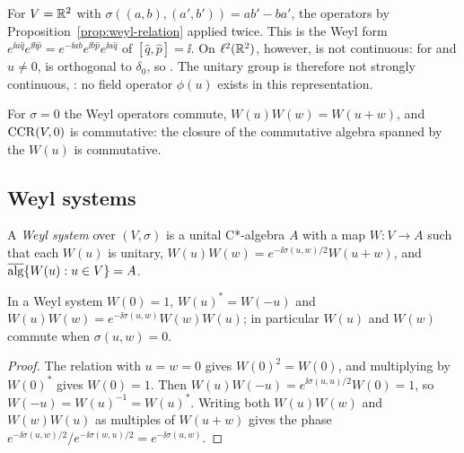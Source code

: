 \begin{example}\label{ex:one-dof}
For $V=\mathbb R^2$ with $\sigma((a,b),(a',b'))=ab'-ba'$, the operators  by Proposition~\ref{prop:weyl-relation} applied twice.
This is the Weyl form $e^{\ii a\hat q}e^{\ii b\hat p}=e^{-\ii ab}e^{\ii b\hat p}e^{\ii a\hat q}$
of $[\hat q,\hat p]=\ii$. On $\ell^2(\mathbb R^2)$, however,  is not continuous: for
 and $u\neq0$,  is orthogonal to $\delta_0$, so
. The unitary group  is therefore not
strongly continuous, : no field operator
$\phi(u)$ exists in this representation.
\end{example}

\begin{example}\label{ex:sigma-zero}
For $\sigma=0$ the Weyl operators commute, $W(u)W(w)=W(u+w)$, and $\operatorname{CCR}(V,0)$ is commutative:
the closure of the commutative algebra spanned by the $W(u)$ is commutative.
\end{example}

\subsection{Weyl systems}

\begin{definition}\label{def:weyl-system}
A \emph{Weyl system} over $(V,\sigma)$ is a unital C*-algebra $A$ with a map $W:V\to A$ such
that each $W(u)$ is unitary, $W(u)W(w)=e^{-\ii\sigma(u,w)/2}W(u+w)$, and
$\overline{\operatorname{alg}}\{W(u):u\in V\}=A$.
\end{definition}

\begin{lemma}\label{lem:weyl-system}
In a Weyl system $W(0)=1$, $W(u)^*=W(-u)$ and $W(u)W(w)=e^{-\ii\sigma(u,w)}W(w)W(u)$; in
particular $W(u)$ and $W(w)$ commute when $\sigma(u,w)=0$.
\end{lemma}
\begin{proof}
The relation with $u=w=0$ gives $W(0)^2=W(0)$, and multiplying by $W(0)^*$ gives $W(0)=1$.
Then $W(u)W(-u)=e^{\ii\sigma(u,u)/2}W(0)=1$, so $W(-u)=W(u)^{-1}=W(u)^*$. Writing both
$W(u)W(w)$ and $W(w)W(u)$ as multiples of $W(u+w)$ gives the phase
$e^{-\ii\sigma(u,w)/2}/e^{-\ii\sigma(w,u)/2}=e^{-\ii\sigma(u,w)}$.
\end{proof}

